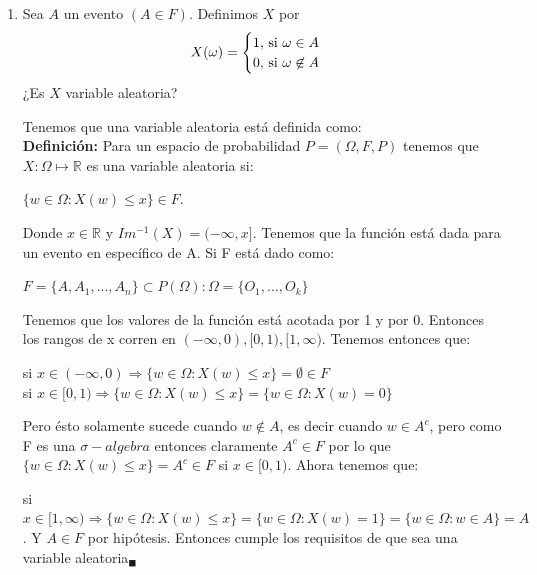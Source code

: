 \documentclass[12pt,a4paper]{report}
\begin{document}
	\begin{enumerate}
		\item {
			Sea $A$ un evento $(A \in F)$. Definimos $X$ por
			\[
				X(\omega) =
				\begin{cases}
					1, $ si $\omega \in A\\
					0, $ si $\omega \not\in A
				\end{cases}
			\]
			¿Es $X$ variable aleatoria?

			Tenemos que una variable aleatoria está definida como: \\
			\textbf{Definición:} Para un espacio de probabilidad $P=(\Omega,F,P)$ tenemos que $X:\Omega \mapsto \mathds{R}$ es una variable aleatoria si:
        		   	\begin{center}
			   $ \lbrace w\in \Omega : X(w) \leq x \rbrace \in F.$
			\end{center}
			Donde $x\in \mathds{R}$ y $Im^{-1}(X)=(-\infty,x]$. Tenemos que la función está dada para un evento en específico de A. Si F está dado como: \\
			\begin{center}
			    $F= \lbrace A, A_{1},...,A_{n} \rbrace \subset P(\Omega): \Omega = \lbrace O_{1},...,O_{k} \rbrace $
			\end{center}
			Tenemos que los valores de la función está acotada por 1 y por 0. Entonces los rangos de x corren en $(-\infty,0),[0,1),[1,\infty)$. Tenemos entonces que:\\
		    \begin{center}
		        si $x\in (-\infty,0) \Rightarrow \lbrace w \in \Omega: X(w) \leq x \rbrace =  \emptyset  \in F $\\
		        si $x\in [0,1)  \Rightarrow \lbrace w \in \Omega: X(w) \leq x \rbrace = \lbrace w\in \Omega : X(w)=0 \rbrace$
		    \end{center}
		    Pero ésto solamente sucede cuando $w\notin A $, es decir cuando $w \in A^c$, pero como F es una $\sigma-algebra$ entonces claramente $A^c\in F$ por lo que $\lbrace w \in \Omega : X(w) \leq x \rbrace = A^c \in F$ si $x\in [0,1)$.  Ahora tenemos que:\\
		    \begin{center}
		        si $x\in [1,\infty) \Rightarrow \lbrace w \in \Omega : X(w) \leq x \rbrace = \lbrace w \in \Omega : X(w)=1 \rbrace  = \lbrace w\in \Omega: w \in A \rbrace = A$.
		        Y $A \in F$ por hipótesis. Entonces cumple los requisitos de que sea una variable aleatoria$_{\blacksquare}$
\end{center}

}
\end{enumerate}
\end{document}
